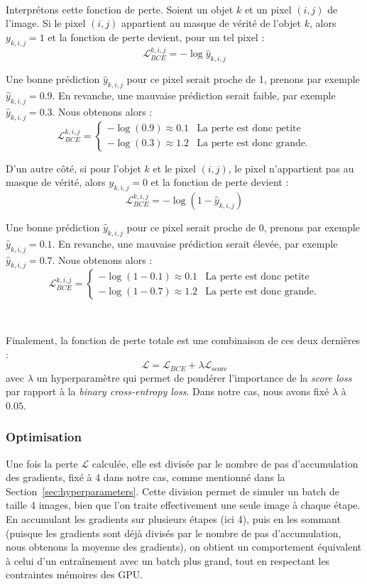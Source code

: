 \documentclass[a4paper,12pt]{report}
\begin{document}
\

Interprétons cette fonction de perte. Soient un objet $k$ et un pixel $(i,j)$ de l'image. Si le pixel $(i,j)$ appartient au masque de vérité de l'objet $k$, alors $y_{k,i,j} = 1 $ et la fonction de perte devient, pour un tel pixel :
$$\mathcal{L}_{BCE}^{k,i,j} = -\log\hat{y}_{k,i,j}$$

Une bonne prédiction $\hat{y}_{k,i,j}$ pour ce pixel serait proche de 1, prenons par exemple $\hat{y}_{k,i,j} = 0.9$. En revanche, une mauvaise prédiction serait faible, par exemple $\hat{y}_{k,i,j} = 0.3$. Nous obtenons alors :
$$\mathcal{L}_{BCE}^{k,i,j} = \begin{cases}
        -\log(0.9) \approx 0.1 & \text{La perte est donc petite}  \\
        -\log(0.3) \approx 1.2 & \text{La perte est donc grande.}
    \end{cases}
$$

D'un autre côté, si pour l'objet $k$ et le pixel $(i,j)$, le pixel n'appartient pas au masque de vérité, alors $y_{k,i,j} = 0$ et la fonction de perte devient :
$$\mathcal{L}_{BCE}^{k,i,j} = -\log(1-\hat{y}_{k,i,j})$$

Une bonne prédiction $\hat{y}_{k,i,j}$ pour ce pixel serait proche de 0, prenons par exemple $\hat{y}_{k,i,j} = 0.1$. En revanche, une mauvaise prédiction serait élevée, par exemple $\hat{y}_{k,i,j} = 0.7$. Nous obtenons alors :
$$\mathcal{L}_{BCE}^{k,i,j} = \begin{cases}
        -\log(1-0.1) \approx 0.1 & \text{La perte est donc petite}  \\
        -\log(1-0.7) \approx 1.2 & \text{La perte est donc grande.}
    \end{cases}$$

\

\vspace{1em}
Finalement, la fonction de perte totale est une combinaison de ces deux dernières :
$$\mathcal{L} = \mathcal{L}_{BCE} + \lambda\mathcal{L}_{\text{score}}$$
\noindent avec $\lambda$ un hyperparamètre qui permet de pondérer l'importance de la \textit{score loss} par rapport à la \textit{binary cross-entropy loss}. Dans notre cas, nous avons fixé $\lambda$ à $0.05$.

\subsubsection{Optimisation}

Une fois la perte $\mathcal{L}$ calculée, elle est divisée par le nombre de pas d'accumulation des gradients, fixé à 4 dans notre cas, comme mentionné dans la Section~\ref{sec:hyperparameters}. Cette division permet de simuler un batch de taille 4 images, bien que l'on traite effectivement une seule image à chaque étape. En accumulant les gradients sur plusieurs étapes (ici 4), puis en les sommant (puisque les gradients sont déjà divisés par le nombre de pas d'accumulation, nous obtenons la moyenne des gradients), on obtient un comportement équivalent à celui d'un entraînement avec un batch plus grand, tout en respectant les contraintes mémoires des GPU.
\end{document}
